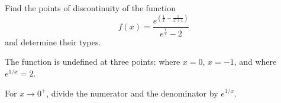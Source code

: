 
\begin{question}
Find the points of discontinuity of the function
\[ f(x)=\frac{e^{\left(\frac1x-\frac{1}{x+1}\right)}}{e^{\frac1x}-2} \]
and determine their types.
\end{question}

\begin{hint}
The function is undefined at three points: where $x=0$, $x=-1$, and where $e^{1/x}=2$.
\end{hint}

\begin{hint}
For $x\to0^+$, divide the numerator and the denominator by $e^{1/x}$.
\end{hint}


